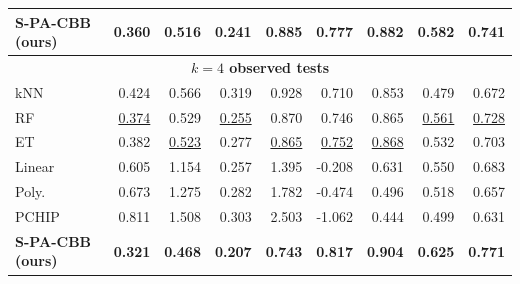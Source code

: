 \begin{table}[t]
{\begin{tabular}{lrrrrrrrr}
\textbf{S-PA-CBB (ours)} & \textbf{0.360} & 0.516 & \textbf{0.241} & 0.885 & \textbf{0.777} & \textbf{0.882} & \textbf{0.582} & \textbf{0.741} \\
\midrule
\multicolumn{9}{c}{\textbf{$k=4$ observed tests}} \\
\midrule
kNN & 0.424 & 0.566 & 0.319 & 0.928 & 0.710 & 0.853 & 0.479 & 0.672 \\
RF & \underline{0.374} & 0.529 & \underline{0.255} & 0.870 & 0.746 & 0.865 & \underline{0.561} & \underline{0.728} \\
ET & 0.382 & \underline{0.523} & 0.277 & \underline{0.865} & \underline{0.752} & \underline{0.868} & 0.532 & 0.703 \\
Linear & 0.605 & 1.154 & 0.257 & 1.395 & -0.208 & 0.631 & 0.550 & 0.683 \\
Poly. & 0.673 & 1.275 & 0.282 & 1.782 & -0.474 & 0.496 & 0.518 & 0.657 \\
PCHIP & 0.811 & 1.508 & 0.303 & 2.503 & -1.062 & 0.444 & 0.499 & 0.631 \\
\textbf{S-PA-CBB (ours)} & \textbf{0.321} & \textbf{0.468} & \textbf{0.207} & \textbf{0.743} & \textbf{0.817} & \textbf{0.904} & \textbf{0.625} & \textbf{0.771} \\
\bottomrule
\end{tabular}%
}
\end{table}
